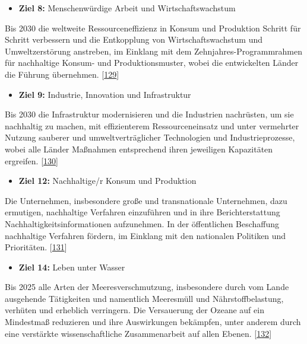 \documentclass[
    headings=optiontotocandhead,%
    twoside,
    numbers=noenddot,%
    12pt, %
    titlepage, %
    parskip=full, %
    listof=leveldown, 
    numbers=noenddot, %
    a4paper,DIV=14,
    BCOR=15mm,
]{scrbook}
\renewenvironment{quote}{\begin{customblockquote}\list{}{\rightmargin=0em\leftmargin=0em}%
\item\relax\color{blockquote-text}\ignorespaces}{\unskip\unskip\endlist\end{customblockquote}}
\providecommand{\tightlist}{%
  \setlength{\itemsep}{0pt}\setlength{\parskip}{0pt}}
\begin{document}
\begin{itemize}
\tightlist
\item
  \textbf{Ziel 8:} Menschenwürdige Arbeit und Wirtschafts­wachstum
\end{itemize}

\begin{quote}
Bis 2030 die weltweite Ressourceneffizienz in Konsum und Produktion
Schritt für Schritt verbessern und die Entkopplung von
Wirtschaftswachstum und Umweltzerstörung anstreben, im Einklang mit dem
Zehnjahres-Programmrahmen für nachhaltige Konsum- und Produktionsmuster,
wobei die entwickelten Länder die Führung übernehmen.
{[}\protect\hyperlink{ref-sdg8}{129}{]}
\end{quote}

\begin{itemize}
\tightlist
\item
  \textbf{Ziel 9:} Industrie, Innovation und Infrastruktur
\end{itemize}

\begin{quote}
Bis 2030 die Infrastruktur modernisieren und die Industrien nachrüsten,
um sie nachhaltig zu machen, mit effizienterem Ressourceneinsatz und
unter vermehrter Nutzung sauberer und umweltverträglicher Technologien
und Industrieprozesse, wobei alle Länder Maßnahmen entsprechend ihren
jeweiligen Kapazitäten ergreifen.
{[}\protect\hyperlink{ref-sdg9}{130}{]}
\end{quote}

\begin{itemize}
\tightlist
\item
  \textbf{Ziel 12:} Nachhaltige/r Konsum und Produktion
\end{itemize}

\begin{quote}
Die Unternehmen, insbesondere große und transnationale Unternehmen, dazu
ermutigen, nachhaltige Verfahren einzuführen und in ihre
Berichterstattung Nachhaltigkeitsinformationen aufzunehmen. In der
öffentlichen Beschaffung nachhaltige Verfahren fördern, im Einklang mit
den nationalen Politiken und Prioritäten.
{[}\protect\hyperlink{ref-sdg12}{131}{]}
\end{quote}

\begin{itemize}
\tightlist
\item
  \textbf{Ziel 14:} Leben unter Wasser
\end{itemize}

\begin{quote}
Bis 2025 alle Arten der Meeresverschmutzung, insbesondere durch vom
Lande ausgehende Tätigkeiten und namentlich Meeresmüll und
Nährstoffbelastung, verhüten und erheblich verringern. Die Versauerung
der Ozeane auf ein Mindestmaß reduzieren und ihre Auswirkungen
bekämpfen, unter anderem durch eine verstärkte wissenschaftliche
Zusammenarbeit auf allen Ebenen.
{[}\protect\hyperlink{ref-sdg14}{132}{]}
\end{quote}
\end{document}
